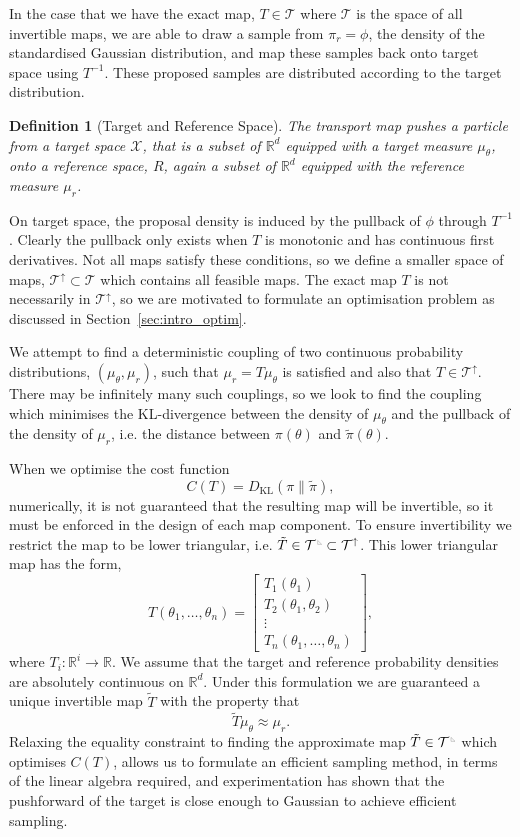 \documentclass[final]{siamltex}
\newtheorem{dfn}{Definition}[section]
\newcommand{\ltri}{%
\,\resizebox{!}{0.25\baselineskip}{%
\begin{tikzpicture}%
\draw[line width=1mm](0,0) -- (0,2) -- (2,0)  -- (0,0);
\end{tikzpicture}%
}\xspace%
}%
\begin{document}
In the case that we have the exact map, $T\in\mathcal{T}$ where $\mathcal{T}$ is the space of all invertible maps, we are able to draw a sample from $\pi_r = \phi$, the density of the standardised Gaussian distribution, and map these samples back onto target space using $T^{-1}$. These proposed samples are distributed according to the target distribution.

\begin{dfn}[Target and Reference Space]
	The transport map pushes a particle from a {\it target space} $\mathcal{X}$, that is a subset of $\mathbb{R}^d$ equipped with a target measure $\mu_{\theta}$, onto a {\it reference space}, $R$, again a subset of $\mathbb{R}^d$ equipped with the reference measure $\mu_r$.
\end{dfn}

On target space, the proposal density is induced by the pullback of $\phi$ through $T^{-1}$.
Clearly the pullback only exists when $T$ is monotonic and has continuous first derivatives.
Not all maps satisfy these conditions, so we define a smaller space of maps, $\mathcal{T}^\uparrow \subset \mathcal{T}$ which contains all feasible maps.
The exact map $T$ is not necessarily in $\mathcal{T}^\uparrow$, so we are motivated to formulate an optimisation problem as discussed in Section~\ref{sec:intro_optim}.

We attempt to find a deterministic coupling of two continuous probability distributions, $(\mu_\theta, \mu_r)$, such that $\mu_r = T\mu_\theta$ is satisfied and also that $T \in \mathcal{T}^\uparrow$. There may be infinitely many such couplings, so we look to find the coupling which minimises the KL-divergence between the density of $\mu_{\theta}$ and the pullback of the density of $\mu_{r}$, i.e. the distance between $\pi(\theta)$ and $\tilde{\pi}(\theta)$.

When we optimise the cost function
\[
	C(T) = D_\text{KL}(\pi\|\tilde{\pi}),
\]
numerically, it is not guaranteed that the resulting map will be invertible, so it must be enforced in the design of each map component. To ensure invertibility we restrict the map to be lower triangular, i.e. $\tilde{T} \in \mathcal{T}^{\ltri}\subset\mathcal{T}^\uparrow$. This lower triangular map has the form,
\[
	T(\theta_1, \dots, \theta_n) = \begin{bmatrix} T_1(\theta_1) \\ T_2(\theta_1, \theta_2) \\ \vdots \\
		T_n(\theta_1, \dots, \theta_n) \end{bmatrix},
\]
where $T_i\colon \mathbb{R}^i \to \mathbb{R}$. We assume that the target and reference probability densities are absolutely continuous on
$\mathbb{R}^d$. Under this formulation we are guaranteed a unique invertible map $\tilde{T}$ with the property that
\[
	\tilde{T}\mu_{\theta} \approx \mu_r.
\]
Relaxing the equality constraint to finding the approximate map $\tilde{T} \in \mathcal{T}^{\ltri}$ which optimises $C(T)$, allows us to formulate an efficient sampling method, in terms of the linear algebra required, and experimentation has shown that the pushforward of the target is close enough to Gaussian to achieve efficient sampling.
\end{document}
